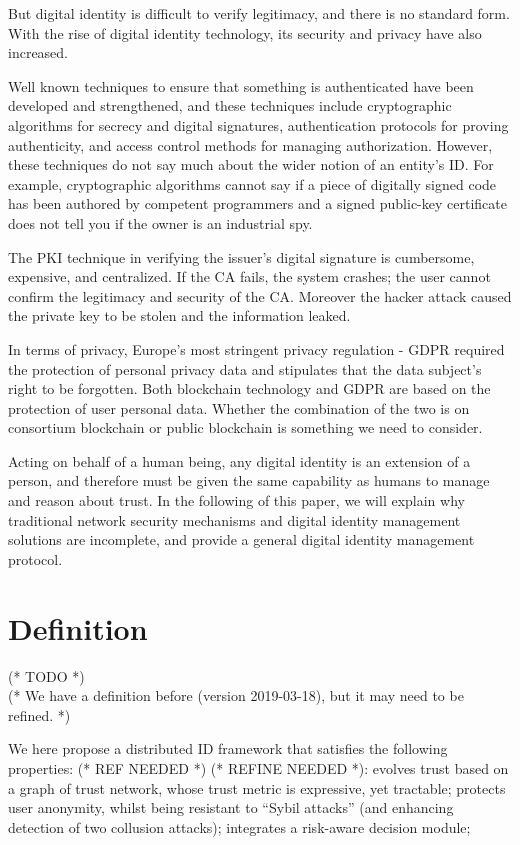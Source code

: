 \documentclass{article}
\begin{document}
But digital identity is difficult to verify legitimacy, and there is no standard form. With the rise of digital identity technology, its security
and privacy have also increased.

Well known techniques to ensure that something is authenticated have been developed and strengthened, and these techniques include cryptographic
algorithms for secrecy and digital signatures, authentication protocols for proving authenticity, and access control methods for managing authorization.
However, these techniques do not say much about the wider notion of an entity{'}s ID. For example, cryptographic algorithms cannot say if a piece
of digitally signed code has been authored by competent programmers and a signed public-key certificate does not tell you if the owner is an industrial
spy.

The PKI technique in verifying the issuer{'}s digital signature is cumbersome, expensive, and centralized. If the CA fails, the system crashes; the
user cannot confirm the legitimacy and security of the CA. Moreover the hacker attack caused the private key to be stolen and the information leaked.

In terms of privacy, Europe{'}s most stringent privacy regulation - GDPR required the protection of personal privacy data and stipulates that the
data subject{'}s right to be forgotten. Both blockchain technology and GDPR are based on the protection of user personal data. Whether the combination
of the two is on consortium blockchain or public blockchain is something we need to consider.

Acting on behalf of a human being, any digital identity is an extension of a person, and therefore must be given the same capability as humans to
manage and reason about trust. In the following of this paper, we will explain why traditional network security mechanisms and digital identity management
solutions are incomplete, and provide a general digital identity management protocol.


\section{Definition}

(* TODO *)\\
(* We have a definition before (version 2019-03-18), but it may need to be refined. *)

We here propose a distributed ID framework that satisfies the following properties: (* REF NEEDED *) (* REFINE NEEDED *): evolves trust based on
a graph of trust network, whose trust metric is expressive, yet tractable; protects user anonymity, whilst being resistant to {``}Sybil attacks{''}
(and enhancing detection of two collusion attacks); integrates a risk-aware decision module;
\end{document}
